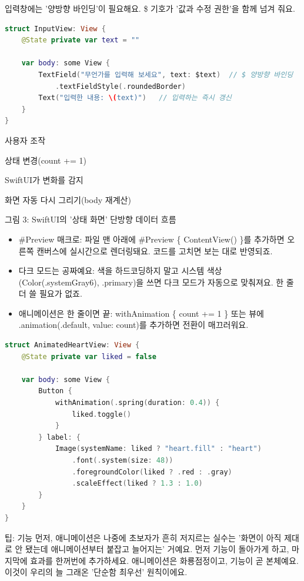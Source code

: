입력창에는 '양방향 바인딩'이 필요해요. \$ 기호가 '값과 수정 권한'을 함께 넘겨 줘요.

\begin{lstlisting}[language=Swift]
struct InputView: View {
    @State private var text = ""

    var body: some View {
        TextField("무언가를 입력해 보세요", text: $text)  // $ 양방향 바인딩
            .textFieldStyle(.roundedBorder)
        Text("입력한 내용: \(text)")   // 입력하는 즉시 갱신
    }
}
\end{lstlisting}

사용자 조작

상태 변경(count += 1)

SwiftUI가 변화를 감지

화면 자동 다시 그리기(body 재계산)

\begin{center}\small\color{gray}그림 3: SwiftUI의 '상태 화면' 단방향 데이터 흐름\end{center}


\begin{itemize}
  \item \#Preview 매크로: 파일 맨 아래에 \#Preview \{ ContentView() \}를 추가하면 오른쪽 캔버스에 실시간으로 렌더링돼요. 코드를 고치면 보는 대로 반영되죠.
  \item 다크 모드는 공짜예요: 색을 하드코딩하지 말고 시스템 색상(Color(.systemGray6), .primary)을 쓰면 다크 모드가 자동으로 맞춰져요. 한 줄 더 쓸 필요가 없죠.
  \item 애니메이션은 한 줄이면 끝: withAnimation \{ count += 1 \} 또는 뷰에 .animation(.default, value: count)를 추가하면 전환이 매끄러워요.
\end{itemize}

\begin{lstlisting}[language=Swift]
struct AnimatedHeartView: View {
    @State private var liked = false

    var body: some View {
        Button {
            withAnimation(.spring(duration: 0.4)) {
                liked.toggle()
            }
        } label: {
            Image(systemName: liked ? "heart.fill" : "heart")
                .font(.system(size: 48))
                .foregroundColor(liked ? .red : .gray)
                .scaleEffect(liked ? 1.3 : 1.0)
        }
    }
}
\end{lstlisting}

\begin{tcbinfo}{팁: 기능 먼저, 애니메이션은 나중에}
초보자가 흔히 저지르는 실수는 '화면이 아직 제대로 안 됐는데 애니메이션부터 붙잡고 늘어지는' 거예요. 먼저 기능이 돌아가게 하고, 마지막에 효과를 한꺼번에 추가하세요. 애니메이션은 화룡점정이고, 기능이 곧 본체예요. 이것이 우리의 늘 그래온 '단순함 최우선' 원칙이에요.

\end{tcbinfo}

